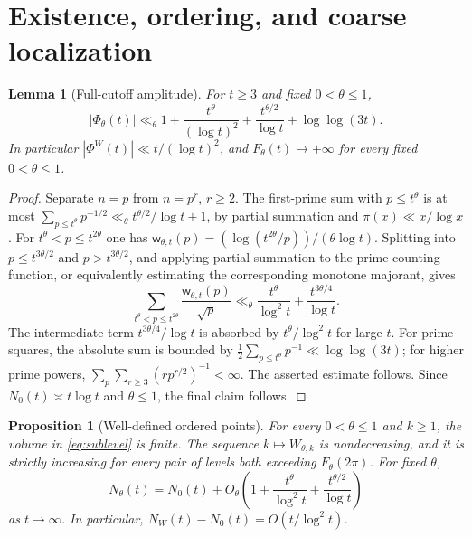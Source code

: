 \documentclass[11pt,leqno]{amsart}
\numberwithin{equation}{section}
\newtheorem{proposition}[theorem]{Proposition}
\newtheorem{lemma}[theorem]{Lemma}
\theoremstyle{definition}
\theoremstyle{remark}
\newcommand{\1}{\mathbf 1}
\newcommand{\wt}{\mathsf w}
\begin{document}
\section{Existence, ordering, and coarse localization}\label{sec:exist}
\begin{lemma}[Full-cutoff amplitude]\label{lem:amplitude}
For $t\ge3$ and fixed $0<\theta\le1$,
\begin{equation}\label{eq:phase-amplitude}
 |\Phi_\theta(t)|\ll_\theta 1+\frac{t^\theta}{(\log t)^2}+\frac{t^{\theta/2}}{\log t}+\log\log(3t).
\end{equation}
In particular $|\Phi^W(t)|\ll t/(\log t)^2$, and $F_\theta(t)\to+\infty$ for every fixed $0<\theta\le1$.
\end{lemma}
\begin{proof}
Separate $n=p$ from $n=p^r$, $r\ge2$. The first-prime sum with $p\le t^\theta$ is at most $\sum_{p\le t^\theta}p^{-1/2}\ll_\theta t^{\theta/2}/\log t+1$, by partial summation and $\pi(x)\ll x/\log x$. For $t^\theta<p\le t^{2\theta}$ one has $\wt_{\theta,t}(p)=(\log(t^{2\theta}/p))/(\theta\log t)$. Splitting into $p\le t^{3\theta/2}$ and $p>t^{3\theta/2}$, and applying partial summation to the prime counting function, or equivalently estimating the corresponding monotone majorant, gives
\[
\sum_{t^\theta<p\le t^{2\theta}}\frac{\wt_{\theta,t}(p)}{\sqrt p}
\ll_\theta \frac{t^\theta}{\log^2t}+\frac{t^{3\theta/4}}{\log t}.
\]
The intermediate term $t^{3\theta/4}/\log t$ is absorbed by $t^\theta/\log^2t$ for large $t$. For prime squares, the absolute sum is bounded by $\frac12\sum_{p\le t^\theta}p^{-1}\ll\log\log(3t)$; for higher prime powers, $\sum_p\sum_{r\ge3}(rp^{r/2})^{-1}<\infty$. The asserted estimate follows. Since $N_0(t)\asymp t\log t$ and $\theta\le1$, the final claim follows.
\end{proof}
\begin{proposition}[Well-defined ordered points]\label{prop:ordered}
For every $0<\theta\le1$ and $k\ge1$, the volume in \eqref{eq:sublevel} is finite. The sequence $k\mapsto W_{\theta,k}$ is nondecreasing, and it is strictly increasing for every pair of levels both exceeding $F_\theta(2\pi)$. For fixed $\theta$,
\begin{equation}\label{eq:coarse-NW}
 N_\theta(t)=N_0(t)+O_\theta\left(1+\frac{t^\theta}{\log^2t}+\frac{t^{\theta/2}}{\log t}\right)
\end{equation}
as $t\to\infty$. In particular, $N_W(t)-N_0(t)=O(t/\log^2t)$.
\end{proposition}
\end{document}
